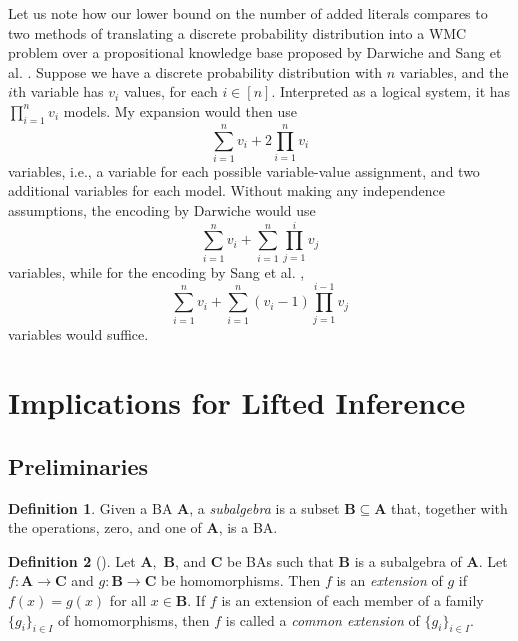 \documentclass{article}
\theoremstyle{definition}
\newtheorem{definition}{Definition}
\theoremstyle{remark}
\begin{document}

Let us note how our lower bound on the number of added literals compares to two
methods of translating a discrete probability distribution into a WMC problem
over a propositional knowledge base proposed by Darwiche
\cite{DBLP:conf/kr/Darwiche02} and Sang et al. \cite{DBLP:conf/aaai/SangBK05}.
Suppose we have a discrete probability distribution with  $n$ variables, and the
$i$th variable has $v_i$ values, for each $i \in [n]$. Interpreted as a logical
system, it has $\prod_{i=1}^n v_i$ models. My expansion would then use
\[
  \sum_{i=1}^n v_i + 2\prod_{i=1}^n v_i
\]
variables, i.e., a variable for each possible variable-value assignment, and two
additional variables for each model. Without making any independence
assumptions, the encoding by Darwiche \cite{DBLP:conf/kr/Darwiche02} would use
\[
  \sum_{i=1}^n v_i + \sum_{i=1}^n \prod_{j=1}^i v_j
\]
variables, while for the encoding by Sang et al. \cite{DBLP:conf/aaai/SangBK05},
\[
  \sum_{i=1}^n v_i + \sum_{i=1}^n (v_i - 1) \prod_{j=1}^{i-1} v_j
\]
variables would suffice.


\section{Implications for Lifted Inference}

\subsection{Preliminaries}

\begin{definition}
  Given a BA $\mathbf{A}$, a \emph{subalgebra} is a subset $\mathbf{B} \subseteq
  \mathbf{A}$ that, together with the operations, zero, and one of $\mathbf{A}$,
  is a BA.
\end{definition}

\begin{definition}[\cite{givant2008introduction}]
  Let $\mathbf{A},$ $\mathbf{B}$, and $\mathbf{C}$ be BAs such that $\mathbf{B}$
  is a subalgebra of $\mathbf{A}$. Let $f\colon \mathbf{A} \to \mathbf{C}$ and
  $g\colon \mathbf{B} \to \mathbf{C}$ be homomorphisms. Then $f$ is an
  \emph{extension} of $g$ if $f(x) = g(x)$ for all $x \in \mathbf{B}$. If $f$ is
  an extension of each member of a family $\{ g_i \}_{i \in I}$ of
  homomorphisms, then $f$ is called a \emph{common extension} of $\{ g_i \}_{i
    \in I}$.
\end{definition}
\end{document}
